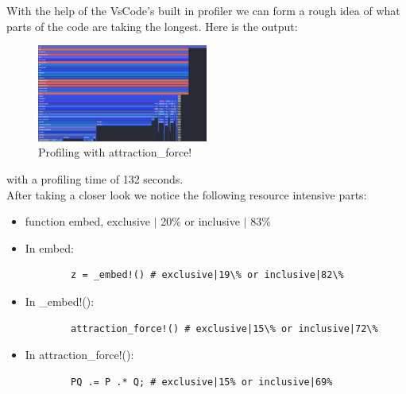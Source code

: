 With the help of the VsCode's built in profiler we can form a rough idea of what parts of the code
are taking the longest. Here is the output:
\begin{figure}[H]
    \includegraphics[width=0.5\textwidth]{media/embedProfiling.png}
    \caption{Profiling with attraction\_force!}
\end{figure}
with a profiling time of 132 seconds. \\

After taking a closer look we notice the following resource intensive parts:
\begin{itemize}
    \item function embed, exclusive $\mid$ 20\% or inclusive $\mid$ 83\% 
    \item In embed: 
    \begin{verbatim}
        z = _embed!() # exclusive|19\% or inclusive|82\%
    \end{verbatim}

    \item In \_embed!(): 
    \begin{verbatim}
        attraction_force!() # exclusive|15\% or inclusive|72\%
    \end{verbatim}

    \item In attraction\_force!(): 
    \begin{verbatim}
        PQ .= P .* Q; # exclusive|15% or inclusive|69%
    \end{verbatim}
\end{itemize}


